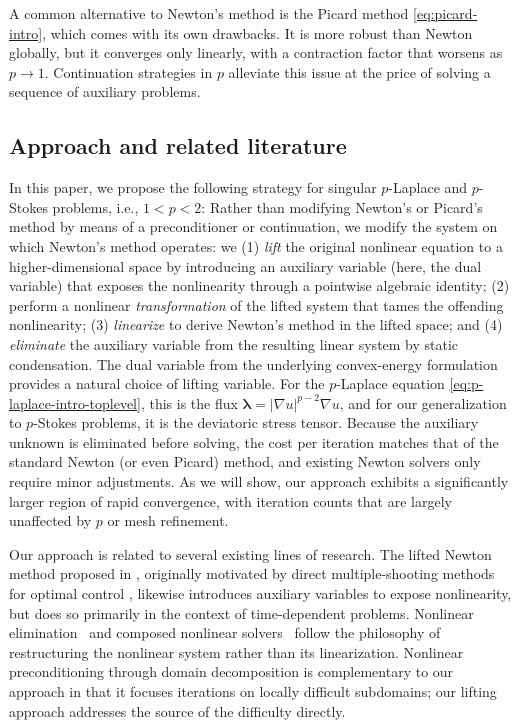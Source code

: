 \documentclass[11pt,pdflatex,sn-mathphys-num]{sn-jnl}
\theoremstyle{thmstyleone}%
\theoremstyle{thmstyletwo}%
\theoremstyle{thmstylethree}%
\newcommand{\bs}[1]{\ensuremath{\boldsymbol{#1}}}
\begin{document}
A common alternative to Newton's method is the Picard method \eqref{eq:picard-intro}, which comes with its own drawbacks. It is more robust
than Newton globally, but it converges only linearly, with a contraction
factor that worsens as $p\to 1$.  Continuation strategies in $p$
\cite{HuangLiLiu07} alleviate this issue at the price of solving a sequence
of auxiliary problems.


\subsection{Approach and related literature}
In this paper, we propose the following strategy for singular $p$-Laplace and $p$-Stokes problems, i.e., $1<p<2$:  Rather than modifying Newton's or Picard's method by means of a preconditioner or continuation, we modify the system on which Newton's method operates: we
(1) \emph{lift} the original nonlinear equation to a
higher-dimensional space by introducing an auxiliary variable (here, the dual variable) that exposes the nonlinearity through a pointwise algebraic identity; (2) perform a nonlinear \emph{transformation} of the lifted system that tames the offending nonlinearity; (3) \emph{linearize} to derive Newton's method in the lifted space; and (4) \emph{eliminate} the auxiliary variable from the resulting linear system by static condensation.  The dual variable from the underlying convex-energy formulation provides a natural choice of lifting variable. For the $p$-Laplace equation \eqref{eq:p-laplace-intro-toplevel}, this is the flux $\bs{\lambda}=|\nabla u|^{p-2}\nabla u$, and for our generalization to $p$-Stokes problems, it is the deviatoric stress tensor.  Because the auxiliary unknown is eliminated before solving, the 
cost per iteration matches that of the standard Newton (or even Picard) method, and existing Newton solvers only require minor adjustments. As we will show, our approach exhibits a significantly larger region of rapid convergence,
with iteration counts that are largely unaffected by $p$ or mesh refinement.

Our approach is related to several existing lines
of research.  The lifted Newton method proposed in
\cite{AlbersmeyerDiehl10}, originally motivated by
direct multiple-shooting methods for optimal control
\cite{BockPlitt84},
likewise introduces auxiliary variables to expose nonlinearity, but does so
primarily in the context of time-dependent problems.  Nonlinear
elimination~\cite{lanzkron1996analysis} and composed nonlinear
solvers~\cite{brune2015composing} follow the philosophy of
restructuring the nonlinear system rather than its linearization.
Nonlinear preconditioning through domain decomposition
\cite{Gander17, DoleanGanderKherijiEtAl16, LiuKeyes16,
LiuHwangLuoEtAl22, HeinleinKlawonnLanser22} is complementary to our
approach in that it focuses iterations on locally difficult
subdomains; our lifting approach addresses the source of the difficulty directly.
\end{document}
